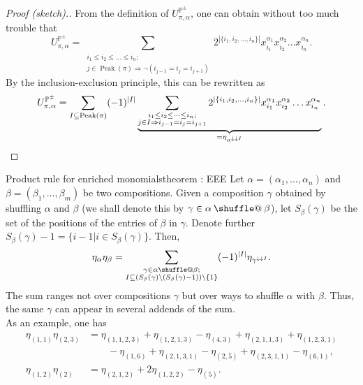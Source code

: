 \documentclass[numbers=enddot,12pt,final,onecolumn,notitlepage]{scrartcl}%
\makeatletter
\newcommand{\al}{\alpha}
\newcommand{\be}{\beta}
\newcommand{\PP}{\mathbb{P}} %
\newcommand{\Peak}{\operatorname{Peak}}
\providecommand*{\shuffle}{%
  \mathbin{\mathpalette\shuffle@{}}%
}
\newcommand*{\shuffle@}[2]{%
  \sbox0{$#1\vcenter{}$}%
  \kern .15\ht0 %
  \rlap{\vrule height .25\ht0 depth 0pt width 2.5\ht0}%
  \raise.1\ht0\hbox to 2.5\ht0{%
    \vrule height 1.75\ht0 depth -.1\ht0 width .17\ht0 %
    \hfill
    \vrule height 1.75\ht0 depth -.1\ht0 width .17\ht0 %
    \hfill
    \vrule height 1.75\ht0 depth -.1\ht0 width .17\ht0 %
  }%
  \kern .15\ht0 %
}
\newcommand{\0}{\phantom{c}}
\let\sumnonlimits\sum
\renewcommand{\sum}{\sumnonlimits\limits}
\makeatother
\begin{document}
\begin{proof}[Proof (sketch).]
From the definition of  $U^{\PP^\pm}_{\pi,\al}$, one can obtain without too much trouble that
\begin{equation*}
U^{\PP^\pm}_{\pi,\al} = \sum_{\substack{i_1\leq i_2\leq\dots \leq i_n;\\j\in \Peak(\pi) \Rightarrow \lnot \left( i_{j-1}=i_{j}=i_{j+1}\right)}}2^{|\{i_1,i_2,\dots,i_n\}|}x_{i_1}^{\al_1}x_{i_2}^{\al_2}\dots x_{i_n}^{\al_n} .
\end{equation*}
By the inclusion-exclusion principle, this can be rewritten as
\begin{equation*}
U^{\PP^\pm}_{\pi,\al} =\sum_{I \subseteq \Peak(\pi)}(-1)^{|I|} \underbrace{\sum_{\substack{i_1\leq i_2\leq\dots \leq i_n;\\j\in I \Rightarrow  i_{j-1}=i_{j}=i_{j+1}}}2^{|\{i_1,i_2,\dots,i_n\}|}x_{i_1}^{\al_1}x_{i_2}^{\al_2}\dots x_{i_n}^{\al_n}}_{\substack{= \eta_{\al^{\downarrow\downarrow I}}\\}} .
\qedhere
\end{equation*}
\end{proof}
%
\begin{theorem}{Product rule for enriched monomials}{theorem : EEE}
Let $\al=(\al_1,\dots,\al_n)$ and $\beta=(\be_1,\dots,\be_m)$ be two compositions. Given a composition $\gamma$ obtained by shuffling $\al$ and $\be$ (we shall denote this by $\gamma \in \al\shuffle\be$), let $S_\beta(\gamma)$ be the set of the positions of the entries of $\beta$ in $\gamma$. Denote further $S_\beta(\gamma)-1 =\{i-1|i \in S_\beta(\gamma)\}$. Then,
\begin{equation}
\label{eq : EEE}
\eta_\al \eta_\beta
= \sum_{\substack{\gamma \in \al \shuffle \be ;\\
                   I\subseteq \left(S_{\be}(\gamma)\setminus (S_{\be}(\gamma)-1)\right) \setminus \left\{1\right\}}}
(-1)^{|I|}\eta_{\gamma^{\downarrow\downarrow I}} .
\end{equation}
The sum ranges not over compositions $\gamma$ but over ways to shuffle $\al$ with $\be$. Thus, the same $\gamma$ can appear in several addends of the sum.\\
As an example, one has
\begin{align*}
\eta_{(1,1)}\eta_{(2,3)} &= \eta_{(1, 1, 2, 3)} + \eta_{(1, 2, 1, 3)} -\eta_{(4, 3)} + \eta_{(2,1,1,3)}+\eta_{(1,2,3,1)}\\
&\qquad -\eta_{(1,6)}+\eta_{(2,1,3,1)}-\eta_{(2,5)}+\eta_{(2,3,1,1)}-\eta_{(6,1)},\\
\eta_{(1,2)}\eta_{(2)} &=  \eta_{(2,1,2)} +   2\eta_{(1,2,2)} - \eta_{(5)}.
\end{align*}
\end{theorem}
\end{document}
